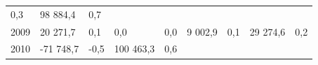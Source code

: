 \begin{longtable}[]{@{}lllllllll@{}}
\begin{minipage}[t]{0.06\columnwidth}
0,3\strut
\end{minipage} & \begin{minipage}[t]{0.09\columnwidth}\raggedright
98 884,4\strut
\end{minipage} & \begin{minipage}[t]{0.06\columnwidth}\raggedright
0,7\strut
\end{minipage}\tabularnewline
\begin{minipage}[t]{0.05\columnwidth}\raggedright
2009\strut
\end{minipage} & \begin{minipage}[t]{0.10\columnwidth}\raggedright
20 271,7\strut
\end{minipage} & \begin{minipage}[t]{0.06\columnwidth}\raggedright
0,1\strut
\end{minipage} & \begin{minipage}[t]{0.16\columnwidth}\raggedright
0,0\strut
\end{minipage} & \begin{minipage}[t]{0.06\columnwidth}\raggedright
0,0\strut
\end{minipage} & \begin{minipage}[t]{0.12\columnwidth}\raggedright
9 002,9\strut
\end{minipage} & \begin{minipage}[t]{0.06\columnwidth}\raggedright
0,1\strut
\end{minipage} & \begin{minipage}[t]{0.09\columnwidth}\raggedright
29 274,6\strut
\end{minipage} & \begin{minipage}[t]{0.06\columnwidth}\raggedright
0,2\strut
\end{minipage}\tabularnewline
\begin{minipage}[t]{0.05\columnwidth}\raggedright
2010\strut
\end{minipage} & \begin{minipage}[t]{0.10\columnwidth}\raggedright
-71 748,7\strut
\end{minipage} & \begin{minipage}[t]{0.06\columnwidth}\raggedright
-0,5\strut
\end{minipage} & \begin{minipage}[t]{0.16\columnwidth}\raggedright
100 463,3\strut
\end{minipage} & \begin{minipage}[t]{0.06\columnwidth}\raggedright
0,6\strut
\end{minipage} & \begin{minipage}[t]{0.12\columnwidth}\raggedright

\end{minipage}
\end{longtable}
